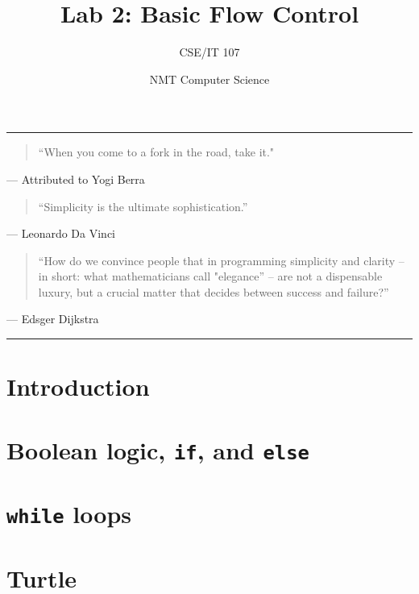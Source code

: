 \documentclass[12pt,hidelinks]{article}
\title{Lab 2: Basic Flow Control}
\author{CSE/IT 107}
\date{NMT Computer Science}
\begin{document}
\maketitle

\hrule

\begin{quotation}
``When you come to a fork in the road, take it."
\end{quotation}
\begin{flushright}
--- Attributed to Yogi Berra
\end{flushright}

\begin{quotation}
``Simplicity is the ultimate sophistication.''
\end{quotation}
\begin{flushright}
--- Leonardo Da Vinci
\end{flushright}

\begin{quotation}
``How do we convince people that in programming simplicity and clarity -- in
short: what mathematicians call "elegance'' -- are not a dispensable luxury, but
a crucial matter that decides between success and failure?''
\end{quotation}
\begin{flushright}
--- Edsger Dijkstra
\end{flushright}

\hrule

\section{Introduction}

\section{Boolean logic, \texttt{if}, and \texttt{else}}

\section{\texttt{while} loops}

\section{Turtle}
\end{document}
